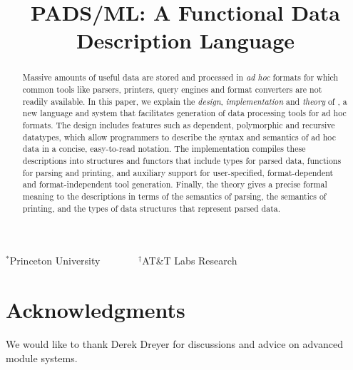\documentclass[nocopyrightspace]{sigplanconf}
\begin{document}
\title{PADS/ML: A Functional Data Description Language}
{$^\ast$Princeton University \ \ \ \ \ \ \ $^\dagger$AT\&T Labs Research}
 { \ \ \ \ }



\maketitle{}

\begin{abstract}  

  Massive amounts of useful data are stored and processed in
  \textit{ad hoc} formats for which common tools like parsers,
  printers, query engines and format converters are not readily 
  available.  In this paper,
  we explain the {\em design}, {\em implementation} and {\em theory} of \padsml{},
  a new language and system that facilitates
  generation of data processing tools for ad hoc formats.
  The \padsml{} design includes features such as
  dependent, polymorphic and recursive datatypes, which allow
  programmers to describe
  the syntax and semantics of ad hoc data in a concise,
  easy-to-read notation.
  The \padsml{} implementation compiles these descriptions
  into \ml{} structures and functors
  that include types for parsed data, functions for parsing
  and printing, and auxiliary support
  for user-specified, format-dependent and format-independent 
  tool generation.
  Finally, the \padsml{} theory gives a precise formal meaning
  to the descriptions in terms of the semantics of parsing,
  the semantics of printing, and the types of data structures
  that represent parsed data.

\end{abstract}















\section*{Acknowledgments}

We would like to thank Derek Dreyer for discussions and advice on
advanced module systems.



%

%
\end{document}
